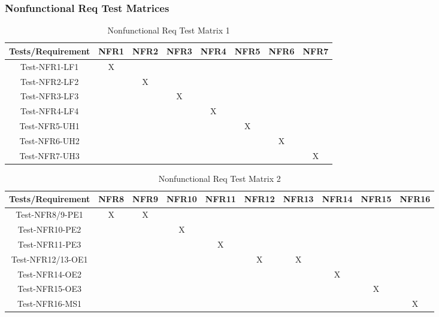 \documentclass[12pt]{article}
\begin{document}
\subsubsection{Nonfunctional Req Test Matrices}
\begin{table}[htp]
\centering
\caption{Nonfunctional Req Test Matrix 1}
\begin{tabular}{|c|c|c|c|c|c|c|c|}
\hline
Tests/Requirement & NFR1 & NFR2 & NFR3 & NFR4 & NFR5 & NFR6 & NFR7 \\
\hline
Test-NFR1-LF1     & X    &      &      &      &      &      &      \\
\hline
Test-NFR2-LF2     &      & X    &      &      &      &      &      \\
\hline
Test-NFR3-LF3     &      &      & X    &      &      &      &      \\
\hline
Test-NFR4-LF4     &      &      &      & X    &      &      &      \\
\hline
Test-NFR5-UH1     &      &      &      &      & X    &      &      \\
\hline
Test-NFR6-UH2     &      &      &      &      &      & X    &      \\
\hline
Test-NFR7-UH3     &      &      &      &      &      &      & X\\
\hline   
\end{tabular}
\end{table}
\begin{table}[htp]
\centering
\caption{Nonfunctional Req Test Matrix 2}
\begin{tabular}{|c|c|c|c|c|c|c|c|c|c|}
\hline
Tests/Requirement & NFR8 & NFR9 & NFR10 & NFR11 & NFR12 & NFR13 & NFR14 & NFR15 & NFR16 \\
\hline
Test-NFR8/9-PE1   & X    & X    &       &       &       &       &       &       &       \\
\hline
Test-NFR10-PE2    &      &      & X     &       &       &       &       &       &       \\
\hline
Test-NFR11-PE3    &      &      &       & X     &       &       &       &       &       \\
\hline
Test-NFR12/13-OE1 &      &      &       &       & X     & X     &       &       &       \\
\hline
Test-NFR14-OE2    &      &      &       &       &       &       & X     &       &       \\
\hline
Test-NFR15-OE3    &      &      &       &       &       &       &       & X     &       \\
\hline
Test-NFR16-MS1    &      &      &       &       &       &       &       &       & X    \\ \hline
\end{tabular}
\end{table}
\end{document}
